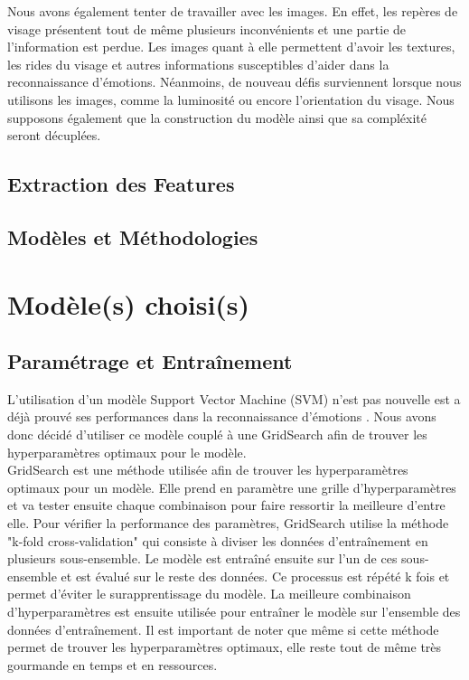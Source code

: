 \documentclass{rapport}
\begin{document}
Nous avons également tenter de travailler avec les images.
En effet, les repères de visage présentent tout de même plusieurs inconvénients et une partie de l'information est perdue.
Les images quant à elle permettent d'avoir les textures,
les rides du visage et autres informations susceptibles d'aider dans la reconnaissance d'émotions.
Néanmoins, de nouveau défis surviennent lorsque nous utilisons les images, comme la luminosité ou encore l'orientation du visage.
Nous supposons également que la construction du modèle ainsi que sa compléxité seront décuplées.

\subsection{Extraction des Features}
\subsection{Modèles et Méthodologies}

\section{Modèle(s) choisi(s)}
\subsection{Paramétrage et Entraînement}

L'utilisation d'un modèle Support Vector Machine (SVM) n'est pas nouvelle est a déjà prouvé ses performances dans la reconnaissance
d'émotions \cite{kalapalaFacialExpressionRecognition2020}. Nous avons donc décidé d'utiliser ce modèle couplé à une GridSearch
afin de trouver les hyperparamètres optimaux pour le modèle.\\

GridSearch est une méthode utilisée afin de trouver les hyperparamètres optimaux pour un modèle. Elle prend en paramètre une grille
d'hyperparamètres et va tester ensuite chaque combinaison pour faire ressortir la meilleure d'entre elle. Pour vérifier la performance
des paramètres, GridSearch utilise la méthode "k-fold cross-validation" qui consiste à diviser les données d'entraînement en plusieurs
sous-ensemble. Le modèle est entraîné ensuite sur l'un de ces sous-ensemble et est évalué sur le reste des données. Ce processus est répété
k fois et permet d'éviter le surapprentissage du modèle. La meilleure combinaison d'hyperparamètres est ensuite utilisée pour entraîner le modèle
sur l'ensemble des données d'entraînement. Il est important de noter que même si cette méthode permet de trouver les hyperparamètres optimaux, elle
reste tout de même très gourmande en temps et en ressources.\\
\end{document}
